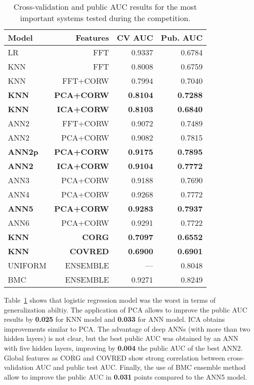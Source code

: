 \documentclass[a4paper,english,twoside]{article}
\begin{document}
\begin{table}
  \centering
  \begin{tabular}{|l|r|rr|}
    \hline
    Model & Features & CV AUC & Pub. AUC\\
    \hline
    \hline
    LR & FFT & 0.9337 & 0.6784\\
    \hline
    KNN & FFT & 0.8008 & 0.6759\\
    KNN & FFT+CORW & 0.7994 & 0.7040\\
    \textbf{KNN} & \textbf{PCA+CORW} & \textbf{0.8104} & \textbf{0.7288}\\
    \textbf{KNN} & \textbf{ICA+CORW} & \textbf{0.8103} & \textbf{0.6840}\\
    \hline
    ANN2 & FFT+CORW & 0.9072 & 0.7489\\
    ANN2 & PCA+CORW & 0.9082 & 0.7815\\
    \textbf{ANN2p} & \textbf{PCA+CORW} & \textbf{0.9175} & \textbf{0.7895}\\
    \textbf{ANN2} & \textbf{ICA+CORW} & \textbf{0.9104} & \textbf{0.7772}\\
    ANN3 & PCA+CORW & 0.9188 & 0.7690\\
    ANN4 & PCA+CORW & 0.9268 & 0.7772\\
    \textbf{ANN5} & \textbf{PCA+CORW} & \textbf{0.9283} & \textbf{0.7937}\\
    ANN6 & PCA+CORW & 0.9291 & 0.7722\\
    \hline
    \textbf{KNN} & \textbf{CORG} & \textbf{0.7097} & \textbf{0.6552}\\
    \textbf{KNN} & \textbf{COVRED} & \textbf{0.6900} & \textbf{0.6901}\\
    \hline
    UNIFORM & ENSEMBLE & --- & 0.8048\\
    BMC & ENSEMBLE & 0.9271 & 0.8249\\
    \hline
  \end{tabular}
  \caption{Cross-validation and public AUC results for the most important
    systems tested during the competition.\label{tab:val}}
\end{table}            

Table~\ref{tab:val} shows that logistic regression model was the worst in
terms of generalization abiltiy. The application of PCA allows to
improve the public AUC results by \textbf{0.025} for KNN model and
\textbf{0.033} for ANN model. ICA obtains improvements similar to PCA.
The advantage of deep ANNs (with more than two hidden layers) is not
clear, but the best public AUC was obtained by an ANN with five hidden
layers, improving by \textbf{0.004} the public AUC of the best ANN2.
Global features as CORG and COVRED show strong correlation between
cross-validation AUC and public test AUC. Finally, the use of BMC
ensemble method allow to improve the public AUC in \textbf{0.031} points
compared to the ANN5 model.
\end{document}
